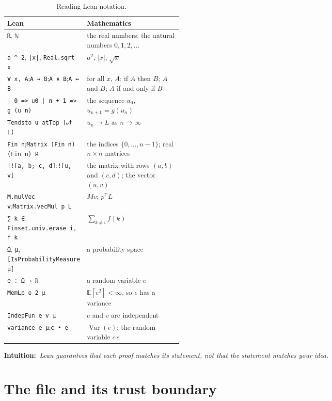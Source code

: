 \documentclass[11pt]{article}
\newcommand{\leanus}{\textunderscore\allowbreak}%
\newcommand{\lean}[1]{\begingroup\let\_\leanus\texttt{#1}\endgroup}
\newcommand{\intuition}[1]{\begin{intuitionbox}\textsf{\textbf{Intuition:}}\ \textit{#1}%
  \end{intuitionbox}}
\newcommand{\Var}{\operatorname{Var}}
\newcommand{\Ex}{\mathbb{E}}
\newcommand{\transp}{\mathsf{T}}
\begin{document}
\begin{table}[htbp]
  \centering\small
  \begin{tabularx}{\linewidth}{@{}>{\raggedright}p{0.42\linewidth}>{\raggedright\arraybackslash}X@{}}
    \toprule
    \textbf{Lean} & \textbf{Mathematics} \\
    \midrule
    \lean{ℝ}, \lean{ℕ} & the real numbers; the natural numbers $0, 1, 2, \dots$ \\
    \lean{a \textasciicircum{} 2}, \lean{|x|}, \lean{Real.sqrt x} & $a^2$, $|x|$, $\sqrt{x}$ \\
    \lean{∀ x, A};\enspace \lean{A → B};\enspace \lean{A ∧ B};\enspace \lean{A ↔ B}
      & for all $x$, $A$; if $A$ then $B$; $A$ and $B$; $A$ if and only if $B$ \\
    \lean{| 0 => u0 | n + 1 => g (u n)} & the sequence $u_0$, $u_{n+1} = g(u_n)$ \\
    \lean{Tendsto u atTop (𝓝 L)} & $u_n \to L$ as $n \to \infty$ \\
    \lean{Fin n};\enspace \lean{Matrix (Fin n) (Fin n) ℝ}
      & the indices $\{0, \dots, n-1\}$; real $n \times n$ matrices \\
    \lean{!![a, b; c, d]};\enspace \lean{![u, v]}
      & the matrix with rows $(a, b)$ and $(c, d)$; the vector $(u, v)$ \\
    \lean{M.mulVec v};\enspace \lean{Matrix.vecMul p L} & $M v$; $p^\transp L$ \\
    \lean{∑ k ∈ Finset.univ.erase i, f k} & $\sum_{k \ne i} f(k)$ \\
    \lean{Ω}, \lean{μ}, \lean{[IsProbabilityMeasure μ]} & a probability space \\
    \lean{e : Ω → ℝ} & a random variable $e$ \\
    \lean{MemLp e 2 μ} & $\Ex[e^2] < \infty$, so $e$ has a variance \\
    \lean{IndepFun e v μ} & $e$ and $v$ are independent \\
    \lean{variance e μ};\enspace \lean{c • e} & $\Var(e)$; the random variable $c\,e$ \\
    \bottomrule
  \end{tabularx}
  \caption{Reading Lean notation.}
  \label{tab:rosetta}
\end{table}

\intuition{Lean guarantees that each proof matches its statement, not that the statement
  matches your idea.}

\section{The file and its trust boundary}
\end{document}
